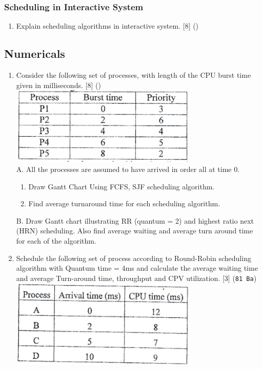 \documentclass[12pt]{article}
\begin{document}
		\subsubsection{Scheduling in Interactive System}
			\begin{enumerate}[noitemsep, topsep = 0pt]
				\item Explain scheduling algorithms in interactive system. \hfill [8] ()
			\end{enumerate}

	\subsection{Numericals}
		\begin{enumerate}
			\item Consider the following set of processes, with length of the CPU burst time given in milliseconds. \hfill [8] ()\\
			\includegraphics[width=3.5in]{./pics/os_1}\\
			A. All the processes are assumed to have arrived in order all at time 0.
			\begin{enumerate}[noitemsep, topsep = 0pt, label = \alph*.]
				\item Draw Gantt Chart Using FCFS, SJF scheduling algorithm.
				\item Find average turnaround time for each scheduling algorithm.
			\end{enumerate}
			B. Draw Gantt chart illustrating RR (quantum = 2) and highest ratio next (HRN) scheduling. Also find average waiting and average turn around time for each of the algorithm.
			
			\item Schedule the following set of process according to Round-Robin scheduling algorithm with Quantum time = 4ms and calculate the average waiting time and average Turn-around time, throughput and CPV utilization. \hfill [3] (\texttt{81 Ba})\\
			\includegraphics[width=3.5in]{./pics/os_2}
			

\end{enumerate}
\end{document}
